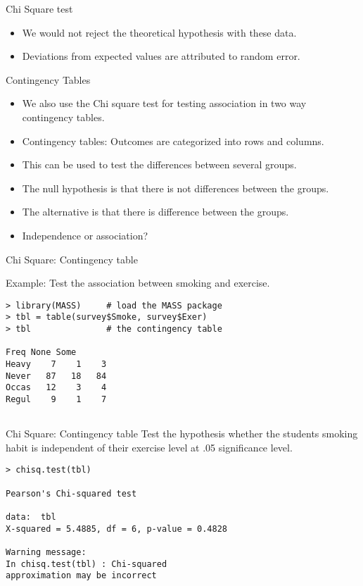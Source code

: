 {Chi Square test}
\begin{itemize}
	\item We would not reject the theoretical hypothesis with these data.
	\item Deviations from expected values are attributed to random error.
\end{itemize}


{Contingency Tables}

\begin{itemize}
	\item We also use the Chi square test for testing association in two way
	contingency tables.
	\item Contingency tables: Outcomes are categorized into rows and columns.
	\item This can be used to test the differences between several groups.
	\item The null hypothesis is that there is not differences between the groups.
	\item The alternative is that there is difference between the groups.
	\item Independence or association?
\end{itemize}





{Chi Square: Contingency table}

Example: Test the association between smoking and exercise.

\begin{verbatim}
> library(MASS)     # load the MASS package
> tbl = table(survey$Smoke, survey$Exer)
> tbl               # the contingency table

Freq None Some
Heavy    7    1    3
Never   87   18   84
Occas   12    3    4
Regul    9    1    7


\end{verbatim}


{Chi Square: Contingency table}
Test the hypothesis whether the students smoking habit is independent of their exercise level at .05 significance level.
\begin{verbatim}
> chisq.test(tbl)

Pearson's Chi-squared test

data:  tbl
X-squared = 5.4885, df = 6, p-value = 0.4828

Warning message:
In chisq.test(tbl) : Chi-squared
approximation may be incorrect

\end{verbatim}





